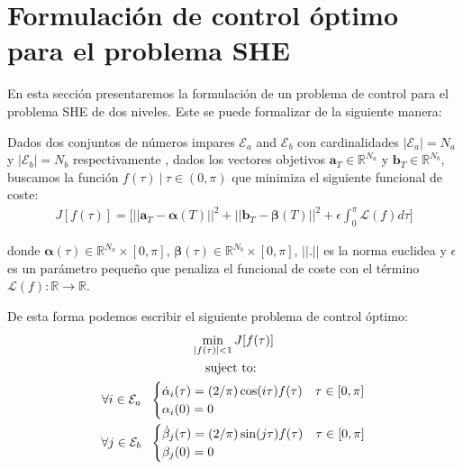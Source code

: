 
\section{Formulación de control óptimo para el problema SHE}

En esta sección presentaremos la formulación de un problema de control para el problema SHE de dos niveles. Este se puede formalizar de la siguiente manera:

\begin{problem}\label{OCP1}
    Dados dos conjuntos de números impares $\mathcal{E}_a$ and $\mathcal{E}_b$ con cardinalidades $|\mathcal{E}_a| = N_a$ y  $|\mathcal{E}_b| = N_b$ respectivamente , dados los vectores objetivos $\bm{a}_T  \in \mathbb{R}^{N_a}$ y $\bm{b}_T  \in \mathbb{R}^{N_b}$, buscamos la función  $f(\tau ) \ | \ \tau \in (0,\pi)$ que minimiza el siguiente funcional de coste:
        \begin{gather}
        J[f(\tau)] = \Bigg[ || \bm{a}_T - \bm{\alpha}(T)||^2 + || \bm{b}_T - \bm{\beta}(T)||^2 
        + \epsilon \int_0^{\pi} \mathcal{L}(f) d\tau \Bigg] 
    \end{gather}

    donde  $\bm{\alpha}(\tau) \in \mathbb{R}^{N_a} \times [0,\pi]$, $\bm{\beta}(\tau) \in \mathbb{R}^{N_b}  \times [0,\pi]$,  $||.||$ es la norma euclidea y $\epsilon$ es un parámetro pequeño que penaliza el funcional de coste con el término $\mathcal{L}(f):\mathbb{R} \rightarrow \mathbb{R}$. 
    \newline

    De esta forma podemos escribir el siguiente problema de control óptimo:
    \begin{gather}
        \min_{|f(\tau) |<1} J[f(\tau)] \\
        \notag \text{suject to: } \\
        \notag \forall i \in \mathcal{E}_a\ \ 
        \begin{cases}
            \dot{\alpha}_i(\tau) = (2/\pi) \cos(i\tau) f(\tau) & \tau \in [0,\pi]\label{dyn}\\
            \alpha_i(0) = 0
        \end{cases} \\
        \notag \forall j \in \mathcal{E}_b\ \ 
        \begin{cases}
            \dot{\beta}_j(\tau) = (2/\pi) \sin(j\tau) f(\tau) & \tau \in [0,\pi]\label{dyn}\\
            \beta_j(0) = 0
        \end{cases} \\
    \end{gather}
\end{problem}

